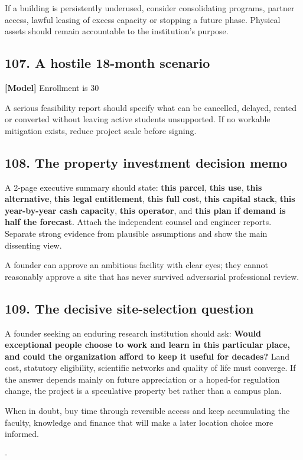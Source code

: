 If a building is persistently underused, consider consolidating programs, partner access, lawful leasing of excess capacity or stopping a future phase. Physical assets should remain accountable to the institution's purpose.


\subsection{107. A hostile 18-month scenario}

\textbf{[Model]} Enrollment is 30%

A serious feasibility report should specify what can be cancelled, delayed, rented or converted without leaving active students unsupported. If no workable mitigation exists, reduce project scale before signing.


\subsection{108. The property investment decision memo}

A 2-page executive summary should state: \textbf{this parcel}, \textbf{this use}, \textbf{this alternative}, \textbf{this legal entitlement}, \textbf{this full cost}, \textbf{this capital stack}, \textbf{this year-by-year cash capacity}, \textbf{this operator}, and \textbf{this plan if demand is half the forecast}. Attach the independent counsel and engineer reports. Separate strong evidence from plausible assumptions and show the main dissenting view.

A founder can approve an ambitious facility with clear eyes; they cannot reasonably approve a site that has never survived adversarial professional review.


\subsection{109. The decisive site-selection question}

A founder seeking an enduring research institution should ask: \textbf{Would exceptional people choose to work and learn in this particular place, and could the organization afford to keep it useful for decades?} Land cost, statutory eligibility, scientific networks and quality of life must converge. If the answer depends mainly on future appreciation or a hoped-for regulation change, the project is a speculative property bet rather than a campus plan.

When in doubt, buy time through reversible access and keep accumulating the faculty, knowledge and finance that will make a later location choice more informed.

-
